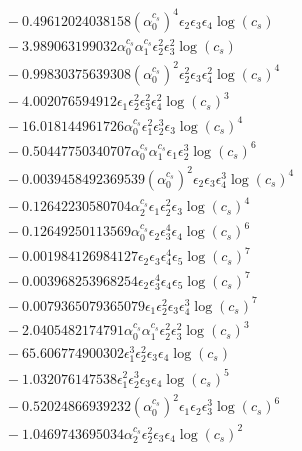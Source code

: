 \documentclass[10pt]{article}
\begin{document}
\begin{align*}
&{}  - 0.49612024038158 \left(\alpha_{0}^{c_s}\right)^{4} \epsilon_{2} \epsilon_{3} \epsilon_{4} \log{\left(c_{s} \right)} \\
&{}  - 3.989063199032 \alpha_{0}^{c_s} \alpha_{1}^{c_s} \epsilon_{2}^{2} \epsilon_{3}^{2} \log{\left(c_{s} \right)} \\
&{}  - 0.99830375639308 \left(\alpha_{0}^{c_s}\right)^{2} \epsilon_{2}^{2} \epsilon_{3} \epsilon_{4}^{2} \log{\left(c_{s} \right)}^{4} \\
&{}  - 4.002076594912 \epsilon_{1} \epsilon_{2}^{2} \epsilon_{3}^{2} \epsilon_{4}^{2} \log{\left(c_{s} \right)}^{3} \\
&{}  - 16.018144961726 \alpha_{0}^{c_s} \epsilon_{1}^{2} \epsilon_{2}^{3} \epsilon_{3} \log{\left(c_{s} \right)}^{4} \\
&{}  - 0.50447750340707 \alpha_{0}^{c_s} \alpha_{1}^{c_s} \epsilon_{1} \epsilon_{2}^{3} \log{\left(c_{s} \right)}^{6} \\
&{}  - 0.0039458492369539 \left(\alpha_{0}^{c_s}\right)^{2} \epsilon_{2} \epsilon_{3} \epsilon_{4}^{3} \log{\left(c_{s} \right)}^{4} \\
&{}  - 0.12642230580704 \alpha_{2}^{c_s} \epsilon_{1} \epsilon_{2}^{2} \epsilon_{3} \log{\left(c_{s} \right)}^{4} \\
&{}  - 0.12649250113569 \alpha_{0}^{c_s} \epsilon_{2} \epsilon_{3}^{4} \epsilon_{4} \log{\left(c_{s} \right)}^{6} \\
&{}  - 0.001984126984127 \epsilon_{2} \epsilon_{3} \epsilon_{4}^{4} \epsilon_{5} \log{\left(c_{s} \right)}^{7} \\
&{}  - 0.003968253968254 \epsilon_{2} \epsilon_{3}^{4} \epsilon_{4} \epsilon_{5} \log{\left(c_{s} \right)}^{7} \\
&{}  - 0.0079365079365079 \epsilon_{1} \epsilon_{2}^{2} \epsilon_{3} \epsilon_{4}^{3} \log{\left(c_{s} \right)}^{7} \\
&{}  - 2.0405482174791 \alpha_{0}^{c_s} \alpha_{1}^{c_s} \epsilon_{2}^{2} \epsilon_{3}^{2} \log{\left(c_{s} \right)}^{3} \\
&{}  - 65.606774900302 \epsilon_{1}^{3} \epsilon_{2}^{2} \epsilon_{3} \epsilon_{4} \log{\left(c_{s} \right)} \\
&{}  - 1.032076147538 \epsilon_{1}^{2} \epsilon_{2}^{3} \epsilon_{3} \epsilon_{4} \log{\left(c_{s} \right)}^{5} \\
&{}  - 0.52024866939232 \left(\alpha_{0}^{c_s}\right)^{2} \epsilon_{1} \epsilon_{2} \epsilon_{3}^{3} \log{\left(c_{s} \right)}^{6} \\
&{}  - 1.0469743695034 \alpha_{2}^{c_s} \epsilon_{2}^{2} \epsilon_{3} \epsilon_{4} \log{\left(c_{s} \right)}^{2} \\

\end{align*}
\end{document}
